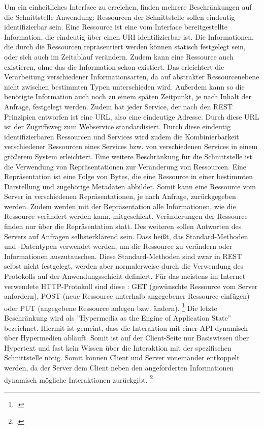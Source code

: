 Um ein einheitliches Interface zu erreichen, finden mehrere Beschränkungen auf die Schnittstelle Anwendung: Ressourcen der Schnittstelle sollen eindeutig identifizierbar sein. Eine Ressource ist eine vom Interface bereitgestellte Information, die eindeutig über einen URI identifizierbar ist. Die Informationen, die durch die Ressourcen repräsentiert werden können statisch festgelegt sein, oder sich auch im Zeitablauf verändern. Zudem kann eine Ressource auch existieren, ohne das die Information schon existiert. Das erleichtert die Verarbeitung verschiedener Informationsarten, da auf abstrakter Ressourcenebene nicht zwischen bestimmten Typen unterschieden wird. Au{\ss}erdem kann so die benötigte Information auch noch zu einem späten Zeitpunkt, je nach Inhalt der Anfrage, festgelegt werden. Zudem hat jeder Service, der nach den REST Prinzipien entworfen ist eine URL, also eine eindeutige Adresse. Durch diese URL ist der Zugriffsweg zum Webservice standardisiert. Durch diese eindeutig identifizierbaren Ressourcen und Services wird zudem die Kombinierbarkeit verschiedener Ressourcen eines Services bzw. von verschiedenen Services in einem grö{\ss}erem System erleichtert. Eine weitere Beschränkung für die Schnittstelle ist die Verwendung von Repräsentationen zur Veränderung von Ressourcen. Eine Repräsentation ist eine Folge von Bytes, die eine Ressource in einer bestimmten Darstellung und zugehörige Metadaten abbildet. Somit kann eine Ressource vom Server in verschiedenen Repräsentationen, je nach Anfrage, zurückgegeben werden. Zudem werden mit der Repräsentation alle Informationen, wie die Ressource verändert werden kann, mitgeschickt. Veränderungen der Ressource finden nur über die Repräsentation statt. Des weiteren sollen Antworten des Servers auf Anfragen selbsterklärend sein. Dass hei{\ss}t, das Standard-Methoden und -Datentypen verwendet werden, um die Ressource zu verändern oder Informationen auszutauschen. Diese Standard-Methoden sind zwar in REST selbst nicht festgelegt, werden aber normalerweise durch die Verwendung des Protokolls auf der Anwendungsschicht definiert. Für das meistens im Internet verwendete HTTP-Protokoll sind diese \zB: GET (gewünschte Ressource vom Server anfordern), POST (neue Ressource unterhalb angegebener Ressource einfügen) oder PUT (angegebene Ressource anlegen bzw. ändern). \footcite[Vgl.][]{fielding_architectural_2000} Die letzte Beschränkung wird als ''Hypermedia as the Engine of Application State'' bezeichnet. Hiermit ist gemeint, dass die Interaktion mit einer API dynamisch über Hypermedien abläuft. Somit ist auf der Client-Seite nur Basiswissen über Hypertext und fast kein Wissen über die Interaktion mit der spezifischen Schnittstelle nötig. Somit können Client und Server voneinander entkoppelt werden, da der Server dem Client neben den angeforderten Informationen dynamisch mögliche Interaktionen zurückgibt. \footcite[Vgl.][]{fielding_rest_2008}

